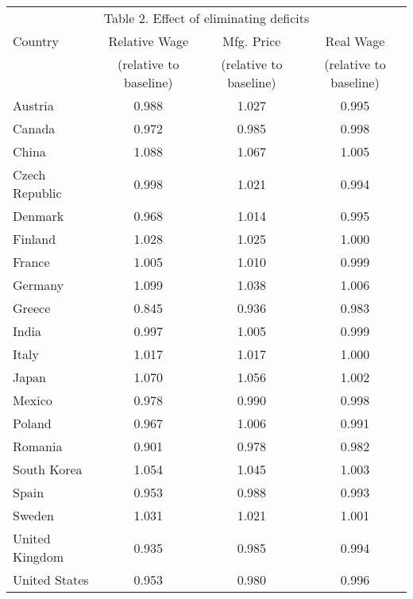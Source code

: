 \begin{tabular}{lccc} \hline
 \multicolumn{4}{c}{Table 2. Effect of eliminating deficits} \\ \cline{1-4}
 Country & Relative Wage & Mfg. Price & Real Wage \\
  & (relative to baseline) & (relative to baseline)  & (relative to baseline) \\ \hline
Austria&0.988&1.027&0.995\\
Canada&0.972&0.985&0.998\\
China&1.088&1.067&1.005\\
Czech Republic&0.998&1.021&0.994\\
Denmark&0.968&1.014&0.995\\
Finland&1.028&1.025&1.000\\
France&1.005&1.010&0.999\\
Germany&1.099&1.038&1.006\\
Greece&0.845&0.936&0.983\\
India&0.997&1.005&0.999\\
Italy&1.017&1.017&1.000\\
Japan&1.070&1.056&1.002\\
Mexico&0.978&0.990&0.998\\
Poland&0.967&1.006&0.991\\
Romania&0.901&0.978&0.982\\
South Korea&1.054&1.045&1.003\\
Spain&0.953&0.988&0.993\\
Sweden&1.031&1.021&1.001\\
United Kingdom&0.935&0.985&0.994\\
United States&0.953&0.980&0.996\\
\hline \end{tabular}
